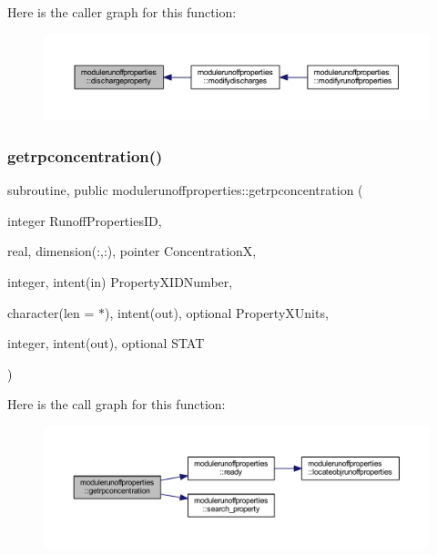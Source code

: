 Here is the caller graph for this function\+:\nopagebreak
\begin{figure}[H]
\begin{center}
\leavevmode
\includegraphics[width=350pt]{namespacemodulerunoffproperties_a0c6359324c15a7b6b781861fed41ffb8_icgraph}
\end{center}
\end{figure}
\mbox{\label{namespacemodulerunoffproperties_a573e563dd1e9a23460bac6983ddf6ceb}} 
\subsubsection{\texorpdfstring{getrpconcentration()}{getrpconcentration()}}
{\footnotesize\ttfamily subroutine, public modulerunoffproperties\+::getrpconcentration (\begin{DoxyParamCaption}\item[{integer}]{Runoff\+Properties\+ID,  }\item[{real, dimension(\+:,\+:), pointer}]{ConcentrationX,  }\item[{integer, intent(in)}]{Property\+X\+I\+D\+Number,  }\item[{character(len = $\ast$), intent(out), optional}]{Property\+X\+Units,  }\item[{integer, intent(out), optional}]{S\+T\+AT }\end{DoxyParamCaption})}

Here is the call graph for this function\+:\nopagebreak
\begin{figure}[H]
\begin{center}
\leavevmode
\includegraphics[width=350pt]{namespacemodulerunoffproperties_a573e563dd1e9a23460bac6983ddf6ceb_cgraph}
\end{center}
\end{figure}
\mbox{\label{namespacemodulerunoffproperties_adc6e3ba349efad4b60c9287d22e284e9}} 
